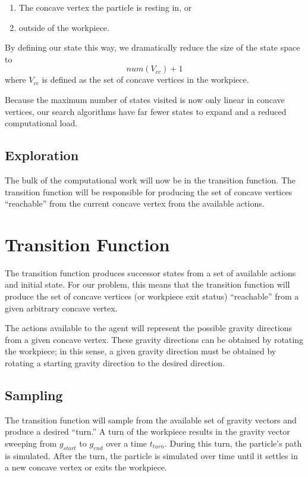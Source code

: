 \begin{enumerate}
\item The concave vertex the particle is resting in, or
\item outside of the workpiece.
\end{enumerate}

By defining our state this way, we dramatically reduce the size of the state space to
$$
num(V_{cc}) + 1
$$
where $V_{cc}$ is defined as the set of concave vertices in the workpiece.

Because the maximum number of states visited is now only linear in concave vertices, our search algorithms have far fewer states to expand and a reduced computational load.

	\subsection{Exploration}

The bulk of the computational work will now be in the transition function. The transition function will be responsible for producing the set of concave vertices ``reachable'' from the current concave vertex from the available actions.

\section{Transition Function}

The transition function produces successor states from a set of available actions and initial state. For our problem, this means that the transition function will produce the set of concave vertices (or workpiece exit status) ``reachable'' from a given arbitrary concave vertex.

The actions available to the agent will represent the possible gravity directions from a given concave vertex. These gravity directions can be obtained by rotating the workpiece; in this sense, a given gravity direction must be obtained by rotating a starting gravity direction to the desired direction.

	\subsection{Sampling}

The transition function will sample from the available set of gravity vectors and produce a desired ``turn.'' A turn of the workpiece results in the gravity vector sweeping from $g_{start}$ to $g_{end}$ over a time $t_{turn}$. During this turn, the particle's path is simulated. After the turn, the particle is simulated over time until it settles in a new concave vertex or exits the workpiece.

